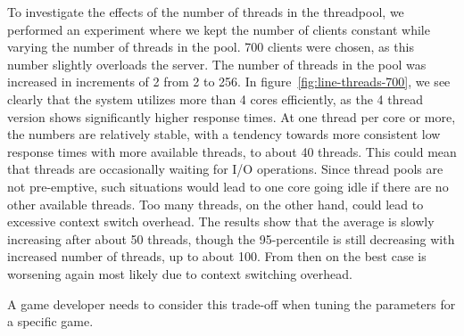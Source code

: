 To investigate the effects of the number of threads in the threadpool,
we performed an experiment where we kept the number of clients
constant while varying the number of threads in the pool. 700 clients
were chosen, as this number slightly overloads the server. The number of threads in the pool was increased in increments of 2 from 2 to 256. In
figure~\ref{fig:line-threads-700}, we see clearly that the system
utilizes more than 4 cores efficiently, as the 4 thread version shows
significantly higher response times. At one thread per core or more,
the numbers are relatively stable, with a tendency towards more
consistent low response times with more available threads, to about 40
threads. This could mean that threads are occasionally waiting for I/O
operations. Since thread pools are not pre-emptive, such situations
would lead to one core going idle if there are no other available
threads. Too many threads, on the other hand, could lead to excessive
context switch overhead. The results show that the average is slowly increasing after about 50 threads, though the 95-percentile is still decreasing with increased number of threads, up to about 100. From then on the best case is worsening again most likely due to context switching overhead.

A game developer needs to consider this trade-off when tuning the parameters for a specific game.


